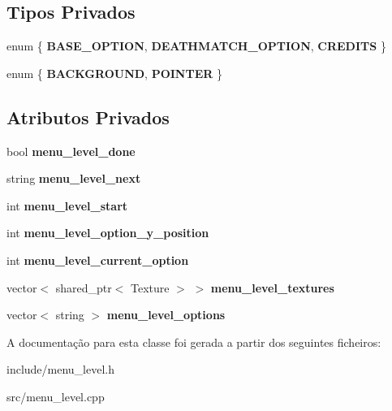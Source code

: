 \subsection*{Tipos Privados}
\begin{DoxyCompactItemize}
\item 
\mbox{\label{classMenuLevel_a46a07b197f64d30cf020bc58dcb7e50e}} 
enum \{ {\bfseries B\+A\+S\+E\+\_\+\+O\+P\+T\+I\+ON}, 
{\bfseries D\+E\+A\+T\+H\+M\+A\+T\+C\+H\+\_\+\+O\+P\+T\+I\+ON}, 
{\bfseries C\+R\+E\+D\+I\+TS}
 \}
\item 
\mbox{\label{classMenuLevel_a6ef5f03132bd0d1a7ceb34f800b1d62e}} 
enum \{ {\bfseries B\+A\+C\+K\+G\+R\+O\+U\+ND}, 
{\bfseries P\+O\+I\+N\+T\+ER}
 \}
\end{DoxyCompactItemize}
\subsection*{Atributos Privados}
\begin{DoxyCompactItemize}
\item 
\mbox{\label{classMenuLevel_a0736601eec1f2f2f9d11a863bcaf7fbb}} 
bool {\bfseries menu\+\_\+level\+\_\+done}
\item 
\mbox{\label{classMenuLevel_a2e458acb753206af5fd7e4669eee427c}} 
string {\bfseries menu\+\_\+level\+\_\+next}
\item 
\mbox{\label{classMenuLevel_a29481a284b638c832504527c2318cf5a}} 
int {\bfseries menu\+\_\+level\+\_\+start}
\item 
\mbox{\label{classMenuLevel_ae850b59099dcb3e69c8366b46a211dd7}} 
int {\bfseries menu\+\_\+level\+\_\+option\+\_\+y\+\_\+position}
\item 
\mbox{\label{classMenuLevel_a99536811d95ed1b23e29270f299c9d48}} 
int {\bfseries menu\+\_\+level\+\_\+current\+\_\+option}
\item 
\mbox{\label{classMenuLevel_a3baea3828c53a17417ec08e584d9e4f5}} 
vector$<$ shared\+\_\+ptr$<$ Texture $>$ $>$ {\bfseries menu\+\_\+level\+\_\+textures}
\item 
\mbox{\label{classMenuLevel_a8d4696e9a825ce70775b0f0642a9fb26}} 
vector$<$ string $>$ {\bfseries menu\+\_\+level\+\_\+options}
\end{DoxyCompactItemize}


A documentação para esta classe foi gerada a partir dos seguintes ficheiros\+:\begin{DoxyCompactItemize}
\item 
include/menu\+\_\+level.\+h\item 
src/menu\+\_\+level.\+cpp\end{DoxyCompactItemize}
